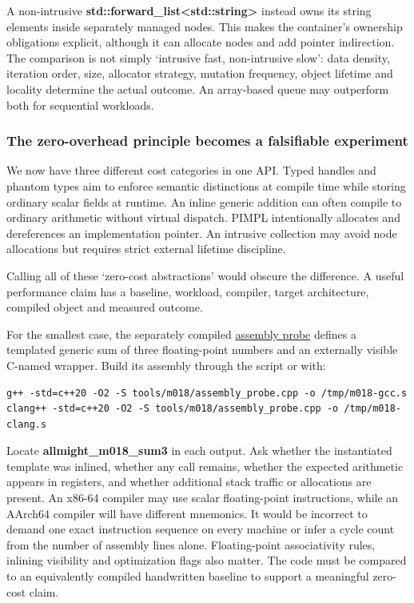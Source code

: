 A non-intrusive \textbf{std::forward\_list\textless std::string\textgreater{}} instead owns its string elements inside separately managed nodes. This makes the container's ownership obligations explicit, although it can allocate nodes and add pointer indirection. The comparison is not simply `intrusive fast, non-intrusive slow': data density, iteration order, size, allocator strategy, mutation frequency, object lifetime and locality determine the actual outcome. An array-based queue may outperform both for sequential workloads.

\subsubsection{The zero-overhead principle becomes a falsifiable experiment}\label{the-zero-overhead-principle-becomes-a-falsifiable-experiment}

We now have three different cost categories in one API. Typed handles and phantom types aim to enforce semantic distinctions at compile time while storing ordinary scalar fields at runtime. An inline generic addition can often compile to ordinary arithmetic without virtual dispatch. PIMPL intentionally allocates and dereferences an implementation pointer. An intrusive collection may avoid node allocations but requires strict external lifetime discipline.

Calling all of these `zero-cost abstractions' would obscure the difference. A useful performance claim has a baseline, workload, compiler, target architecture, compiled object and measured outcome.

For the smallest case, the separately compiled \href{tools/m018/assembly_probe.cpp}{assembly probe} defines a templated generic sum of three floating-point numbers and an externally visible C-named wrapper. Build its assembly through the script or with:

\begin{verbatim}
g++ -std=c++20 -O2 -S tools/m018/assembly_probe.cpp -o /tmp/m018-gcc.s
clang++ -std=c++20 -O2 -S tools/m018/assembly_probe.cpp -o /tmp/m018-clang.s
\end{verbatim}

Locate \textbf{allmight\_m018\_sum3} in each output. Ask whether the instantiated template was inlined, whether any call remains, whether the expected arithmetic appears in registers, and whether additional stack traffic or allocations are present. An x86-64 compiler may use scalar floating-point instructions, while an AArch64 compiler will have different mnemonics. It would be incorrect to demand one exact instruction sequence on every machine or infer a cycle count from the number of assembly lines alone. Floating-point associativity rules, inlining visibility and optimization flags also matter. The code must be compared to an equivalently compiled handwritten baseline to support a meaningful zero-cost claim.

